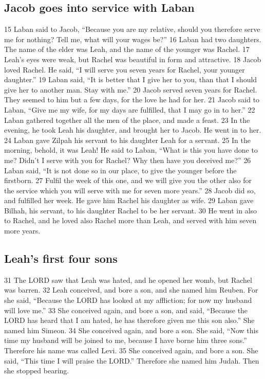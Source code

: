 \hypertarget{jacob-goes-into-service-with-laban}{%
\subsection{Jacob goes into service with
Laban}\label{jacob-goes-into-service-with-laban}}

{15} Laban said to Jacob, ``Because you are my relative, should you
therefore serve me for nothing? Tell me, what will your wages be?'' {16}
Laban had two daughters. The name of the elder was Leah, and the name of
the younger was Rachel. {17} Leah's eyes were weak, but Rachel was
beautiful in form and attractive. {18} Jacob loved Rachel. He said, ``I
will serve you seven years for Rachel, your younger daughter.'' {19}
Laban said, ``It is better that I give her to you, than that I should
give her to another man. Stay with me.'' {20} Jacob served seven years
for Rachel. They seemed to him but a few days, for the love he had for
her. {21} Jacob said to Laban, ``Give me my wife, for my days are
fulfilled, that I may go in to her.'' {22} Laban gathered together all
the men of the place, and made a feast. {23} In the evening, he took
Leah his daughter, and brought her to Jacob. He went in to her. {24}
Laban gave Zilpah his servant to his daughter Leah for a servant. {25}
In the morning, behold, it was Leah! He said to Laban, ``What is this
you have done to me? Didn't I serve with you for Rachel? Why then have
you deceived me?'' {26} Laban said, ``It is not done so in our place, to
give the younger before the firstborn. {27} Fulfil the week of this one,
and we will give you the other also for the service which you will serve
with me for seven more years.'' {28} Jacob did so, and fulfilled her
week. He gave him Rachel his daughter as wife. {29} Laban gave Bilhah,
his servant, to his daughter Rachel to be her servant. {30} He went in
also to Rachel, and he loved also Rachel more than Leah, and served with
him seven more years.

\hypertarget{leahs-first-four-sons}{%
\subsection{Leah's first four sons}\label{leahs-first-four-sons}}

{31} The LORD saw that Leah was hated, and he opened her womb, but
Rachel was barren. {32} Leah conceived, and bore a son, and she named
him Reuben. For she said, ``Because the LORD has looked at my
affliction; for now my husband will love me.'' {33} She conceived again,
and bore a son, and said, ``Because the LORD has heard that I am hated,
he has therefore given me this son also.'' She named him Simeon. {34}
She conceived again, and bore a son. She said, ``Now this time my
husband will be joined to me, because I have borne him three sons.''
Therefore his name was called Levi. {35} She conceived again, and bore a
son. She said, ``This time I will praise the LORD.'' Therefore she named
him Judah. Then she stopped bearing.

